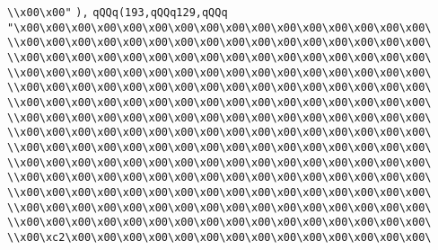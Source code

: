 \verb|\\x00\x00"|\newline
\verb|),|\newline
\verb|qQQq(193,qQQq129,qQQq|\newline
\verb|"\x00\x00\x00\x00\x00\x00\x00\x00\x00\x00\x00\x00\x00\x00\x00\x00\|\newline
\verb|\\x00\x00\x00\x00\x00\x00\x00\x00\x00\x00\x00\x00\x00\x00\x00\x00\|\newline
\verb|\\x00\x00\x00\x00\x00\x00\x00\x00\x00\x00\x00\x00\x00\x00\x00\x00\|\newline
\verb|\\x00\x00\x00\x00\x00\x00\x00\x00\x00\x00\x00\x00\x00\x00\x00\x00\|\newline
\verb|\\x00\x00\x00\x00\x00\x00\x00\x00\x00\x00\x00\x00\x00\x00\x00\x00\|\newline
\verb|\\x00\x00\x00\x00\x00\x00\x00\x00\x00\x00\x00\x00\x00\x00\x00\x00\|\newline
\verb|\\x00\x00\x00\x00\x00\x00\x00\x00\x00\x00\x00\x00\x00\x00\x00\x00\|\newline
\verb|\\x00\x00\x00\x00\x00\x00\x00\x00\x00\x00\x00\x00\x00\x00\x00\x00\|\newline
\verb|\\x00\x00\x00\x00\x00\x00\x00\x00\x00\x00\x00\x00\x00\x00\x00\x00\|\newline
\verb|\\x00\x00\x00\x00\x00\x00\x00\x00\x00\x00\x00\x00\x00\x00\x00\x00\|\newline
\verb|\\x00\x00\x00\x00\x00\x00\x00\x00\x00\x00\x00\x00\x00\x00\x00\x00\|\newline
\verb|\\x00\x00\x00\x00\x00\x00\x00\x00\x00\x00\x00\x00\x00\x00\x00\x00\|\newline
\verb|\\x00\x00\x00\x00\x00\x00\x00\x00\x00\x00\x00\x00\x00\x00\x00\x00\|\newline
\verb|\\x00\x00\x00\x00\x00\x00\x00\x00\x00\x00\x00\x00\x00\x00\x00\x00\|\newline
\verb|\\x00\xc2\x00\x00\x00\x00\x00\x00\x00\x00\x00\x00\x00\x00\x00\x00\|\newline
